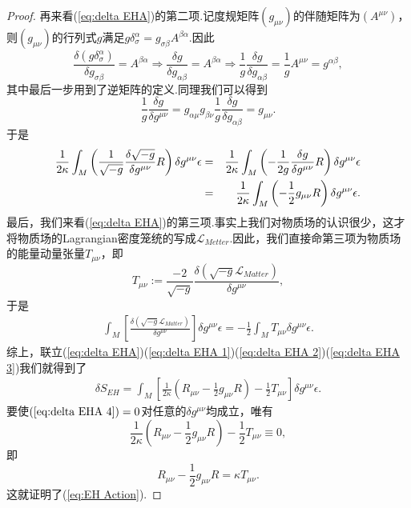 \begin{proof}
            再来看(\ref{eq:delta EHA})的第二项.记度规矩阵$(g_{\mu\nu})$的伴随矩阵为$(A^{\mu\nu})$，则$(g_{\mu\nu})$的行列式$g$满足$g\delta_\sigma^\alpha=g_{\sigma\beta}A^{\beta\alpha}$.因此
            $$\frac{\delta \left(g\delta_\sigma^\alpha\right)}{\delta g_{\sigma\beta}}=A^{\beta\alpha}\Rightarrow\frac{\delta g}{\delta g_{\alpha\beta}}=A^{\beta\alpha}\Rightarrow\frac{1}{g}\frac{\delta g}{\delta g_{\alpha\beta}}=\frac{1}{g}A^{\mu\nu}=g^{\alpha\beta},$$
            其中最后一步用到了逆矩阵的定义.同理我们可以得到
            $$\frac{1}{g}\frac{\delta g}{\delta g^{\mu\nu}}=g_{\alpha\mu}g_{\beta\nu}\frac{1}{g}\frac{\delta g}{\delta g_{\alpha\beta}}=g_{\mu\nu}.$$
            于是
            \begin{eqnarray}\label{eq:delta EHA 2}
                \frac{1}{2\kappa}\int_M\left(\frac{1}{\sqrt{-g}}\frac{\delta\sqrt{-g}}{\delta g^{\mu\nu}}R\right)\delta g^{\mu\nu}\epsilon&=&\frac{1}{2\kappa}\int_M\left(-\frac{1}{2g}\frac{\delta g}{\delta g^{\mu\nu}}R\right)\delta g^{\mu\nu}\epsilon\notag\\
                &=&\frac{1}{2\kappa}\int_M\left(-\frac{1}{2}g_{\mu\nu}R\right)\delta g^{\mu\nu}\epsilon.
            \end{eqnarray}
            最后，我们来看(\ref{eq:delta EHA})的第三项.事实上我们对物质场的认识很少，这才将物质场的Lagrangian密度笼统的写成$\mathcal{L}_{Metter}$.因此，我们直接命第三项为物质场的能量动量张量$T_{\mu\nu}$，即
            $$T_{\mu\nu}:=\frac{-2}{\sqrt{-g}}\frac{\delta\left(\sqrt{-g}\mathcal{L} _{Matter}\right)}{\delta g^{\mu\nu}},$$
            于是
            \begin{eqnarray}\label{eq:delta EHA 3}
                \int_M\left[\frac{\delta\left(\sqrt{-g}\mathcal{L}_{Matter}\right)}{\delta g^{\mu\nu}}\right]\delta g^{\mu\nu}\epsilon=-\frac{1}{2}\int_MT_{\mu\nu}\delta g^{\mu\nu}\epsilon.
            \end{eqnarray}
            综上，联立(\ref{eq:delta EHA})(\ref{eq:delta EHA 1})(\ref{eq:delta EHA 2})(\ref{eq:delta EHA 3})我们就得到了
            \begin{eqnarray}\label{eq:delta EHA 4}
                \delta S_{EH}=\int_M\left[\frac{1}{2\kappa}\left(R_{\mu\nu}-\frac{1}{2}g_{\mu\nu}R\right)-\frac{1}{2}T_{\mu\nu}\right]\delta g^{\mu\nu}\epsilon.
            \end{eqnarray}
            要使$(\ref{eq:delta EHA 4})=0$对任意的$\delta g^{\mu\nu}$均成立，唯有
            $$\frac{1}{2\kappa}\left(R_{\mu\nu}-\frac{1}{2}g_{\mu\nu}R\right)-\frac{1}{2}T_{\mu\nu}\equiv0,$$
            即
            $$R_{\mu\nu}-\frac{1}{2}g_{\mu\nu}R=\kappa T_{\mu\nu}.$$
            这就证明了(\ref{eq:EH Action}).
        \end{proof}
